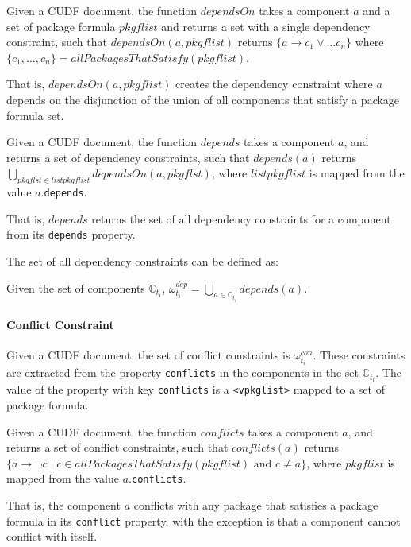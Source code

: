 \begin{defs}
Given a CUDF document, the function $dependsOn$ takes a component $a$ and a set of package formula $pkgflist$ and returns a set with a single dependency constraint,
such that $dependsOn(a,pkgflist)$ returns $\{a \rightarrow c_1 \vee \ldots c_n\}$ where  $\{c_1,\ldots,c_n\} = allPackagesThatSatisfy(pkgflist)$.
\end{defs}
That is, $dependsOn(a,pkgflist)$ creates the dependency  constraint where $a$ depends on the disjunction of the union of all components that satisfy a package formula set. 

\begin{defs}
Given a CUDF document, the function $depends$ takes a component $a$, and returns a set of dependency constraints,
such that $depends(a)$ returns $\bigcup \limits_{pkgflst \in listpkgflist} dependsOn(a,pkgflst)$, where $listpkgflist$ is mapped from the value $a$.\texttt{depends}.
\end{defs}
That is, $depends$ returns the set of all dependency constraints for a component from its \verb+depends+ property.

The set of all dependency constraints can be defined as:
\begin{defs}
Given the set of components $\mathbb{C}_{t_i}$, $\omega_{t_i}^{dep} = \bigcup \limits_{a \in \mathbb{C}_{t_i}} depends(a)$.
\end{defs}

\paragraph{Conflict Constraint}
Given a CUDF document, the set of conflict constraints is $\omega_{t_i}^{con}$.
These constraints are extracted from the property \texttt{conflicts} in the components in the set $\mathbb{C}_{t_i}$.
The value of the property with key \texttt{conflicts} is a \texttt{<vpkglist>} mapped to a set of package formula.

\begin{defs}
Given a CUDF document, the function $conflicts$ takes a component $a$, and returns a set of conflict constraints,
such that $conflicts(a)$ returns $\{a \rightarrow \neg c \mid c \in allPackagesThatSatisfy(pkgflist) \mbox { and } c \not = a \}$, where $pkgflist$ is mapped from the value $a$.\texttt{conflicts}.
\end{defs}

That is, the component $a$ conflicts with any package that satisfies a package formula in its \texttt{conflict} property,
with the exception is that a component cannot conflict with itself.

